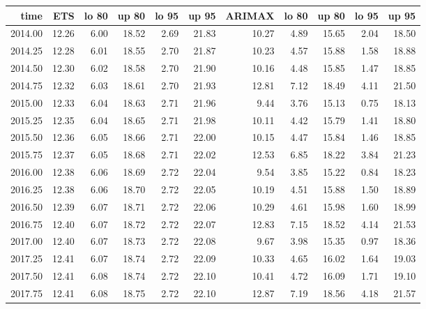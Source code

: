 \documentclass[10pt,a4paper]{article}\usepackage[]{graphicx}\usepackage[]{color}
\begin{document}
\begin{table}[ht]
\centering
\begin{tabular}{rrrrrrrrrrr}
  \hline
time & ETS  & lo 80 & up 80 & lo 95 & up 95 & ARIMAX  & lo 80 & up 80 & lo 95 & up 95 \\ 
  \hline
2014.00 & 12.26 & 6.00 & 18.52 & 2.69 & 21.83 & 10.27 & 4.89 & 15.65 & 2.04 & 18.50 \\ 
  2014.25 & 12.28 & 6.01 & 18.55 & 2.70 & 21.87 & 10.23 & 4.57 & 15.88 & 1.58 & 18.88 \\ 
  2014.50 & 12.30 & 6.02 & 18.58 & 2.70 & 21.90 & 10.16 & 4.48 & 15.85 & 1.47 & 18.85 \\ 
  2014.75 & 12.32 & 6.03 & 18.61 & 2.70 & 21.93 & 12.81 & 7.12 & 18.49 & 4.11 & 21.50 \\ 
  2015.00 & 12.33 & 6.04 & 18.63 & 2.71 & 21.96 & 9.44 & 3.76 & 15.13 & 0.75 & 18.13 \\ 
  2015.25 & 12.35 & 6.04 & 18.65 & 2.71 & 21.98 & 10.11 & 4.42 & 15.79 & 1.41 & 18.80 \\ 
  2015.50 & 12.36 & 6.05 & 18.66 & 2.71 & 22.00 & 10.15 & 4.47 & 15.84 & 1.46 & 18.85 \\ 
  2015.75 & 12.37 & 6.05 & 18.68 & 2.71 & 22.02 & 12.53 & 6.85 & 18.22 & 3.84 & 21.23 \\ 
  2016.00 & 12.38 & 6.06 & 18.69 & 2.72 & 22.04 & 9.54 & 3.85 & 15.22 & 0.84 & 18.23 \\ 
  2016.25 & 12.38 & 6.06 & 18.70 & 2.72 & 22.05 & 10.19 & 4.51 & 15.88 & 1.50 & 18.89 \\ 
  2016.50 & 12.39 & 6.07 & 18.71 & 2.72 & 22.06 & 10.29 & 4.61 & 15.98 & 1.60 & 18.99 \\ 
  2016.75 & 12.40 & 6.07 & 18.72 & 2.72 & 22.07 & 12.83 & 7.15 & 18.52 & 4.14 & 21.53 \\ 
  2017.00 & 12.40 & 6.07 & 18.73 & 2.72 & 22.08 & 9.67 & 3.98 & 15.35 & 0.97 & 18.36 \\ 
  2017.25 & 12.41 & 6.07 & 18.74 & 2.72 & 22.09 & 10.33 & 4.65 & 16.02 & 1.64 & 19.03 \\ 
  2017.50 & 12.41 & 6.08 & 18.74 & 2.72 & 22.10 & 10.41 & 4.72 & 16.09 & 1.71 & 19.10 \\ 
  2017.75 & 12.41 & 6.08 & 18.75 & 2.72 & 22.10 & 12.87 & 7.19 & 18.56 & 4.18 & 21.57 \\ 
   \hline
\end{tabular}
\end{table}
\end{document}
